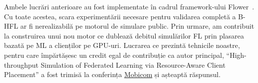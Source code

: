 Ambele lucrări anterioare au fost implementate în cadrul framework-ului Flower~\citep{Flower}. Cu toate acestea, scara experimentării necesare pentru validarea completă a B-HFL ar fi nerealizabilă pe motorul de simulare public. Prin urmare, am contribuit la construirea unui nou motor ce dublează debitul simulărilor FL prin plasarea bazată pe ML a clienților pe GPU-uri. Lucrarea ce prezintă tehnicile noastre, pentru care împărtășesc un credit egal de contribuție ca autor principal, ``High-throughput Simulation of Federated Learning via Resource-Aware Client Placement'' a fost trimisă la conferința \href{https://sigmobile.org/mobicom/2023/}{Mobicom} și așteaptă răspunsul.